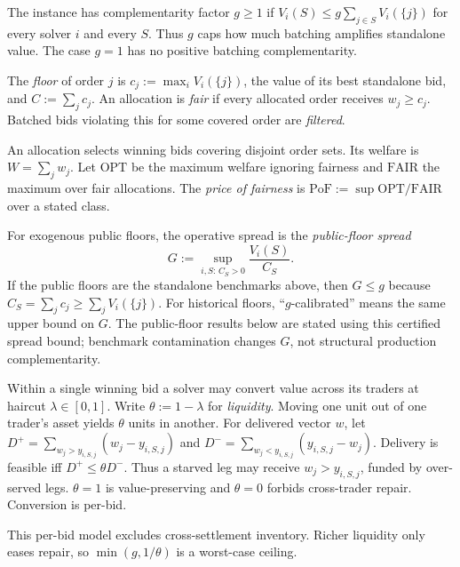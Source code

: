 \documentclass{llncs}
\newcommand{\OPT}{\mathrm{OPT}}
\newcommand{\FAIR}{\mathrm{FAIR}}
\newcommand{\PoF}{\mathrm{PoF}}
\begin{document}
\begin{definition}\label{def:g}
The instance has complementarity factor $g\ge1$ if
$V_i(S)\le g\sum_{j\in S}V_i(\{j\})$ for every solver $i$ and every $S$.
Thus $g$ caps how much batching amplifies standalone value. The case
$g=1$ has no positive batching complementarity.
\end{definition}

\begin{definition}\label{def:fair}
The \emph{floor} of order $j$ is $c_j:=\max_i V_i(\{j\})$, the value of
its best standalone bid, and $C:=\sum_j c_j$. An allocation is \emph{fair} if
every allocated order receives $w_j\ge c_j$. Batched bids violating this
for some covered order are \emph{filtered}.
\end{definition}

An allocation selects winning bids covering disjoint order sets. Its
welfare is $W=\sum_j w_j$. Let $\OPT$ be the maximum welfare ignoring
fairness and $\FAIR$ the maximum over fair allocations. The \emph{price
of fairness} is $\PoF:=\sup\OPT/\FAIR$ over a stated class.

For exogenous public floors, the operative spread is the
\emph{public-floor spread}
\[
  G:=\sup_{i,S:\,C_S>0}\frac{V_i(S)}{C_S}.
\]
If the public floors are the standalone benchmarks above, then
$G\le g$ because $C_S=\sum_jc_j\ge\sum_jV_i(\{j\})$. For historical
floors, ``$g$-calibrated'' means the same upper bound on $G$. The
public-floor results below are stated using this certified spread bound;
benchmark contamination changes $G$, not structural production
complementarity.

\begin{definition}\label{def:theta}
Within a single winning bid a solver may convert value across its traders
at haircut $\lambda\in[0,1]$. Write $\theta:=1-\lambda$ for
\emph{liquidity}. Moving one unit out of one trader's asset yields
$\theta$ units in another. For delivered vector $w$, let
$D^+=\sum_{w_j>y_{i,S,j}}(w_j-y_{i,S,j})$ and
$D^-=\sum_{w_j<y_{i,S,j}}(y_{i,S,j}-w_j)$. Delivery is feasible iff
$D^+\le\theta D^-$.
Thus a starved leg may receive $w_j>y_{i,S,j}$, funded by over-served legs.
$\theta=1$ is value-preserving and $\theta=0$ forbids cross-trader repair.
Conversion is per-bid.
\end{definition}

This per-bid model excludes cross-settlement inventory. Richer liquidity
only eases repair, so $\min(g,1/\theta)$ is a worst-case ceiling.
\end{document}
